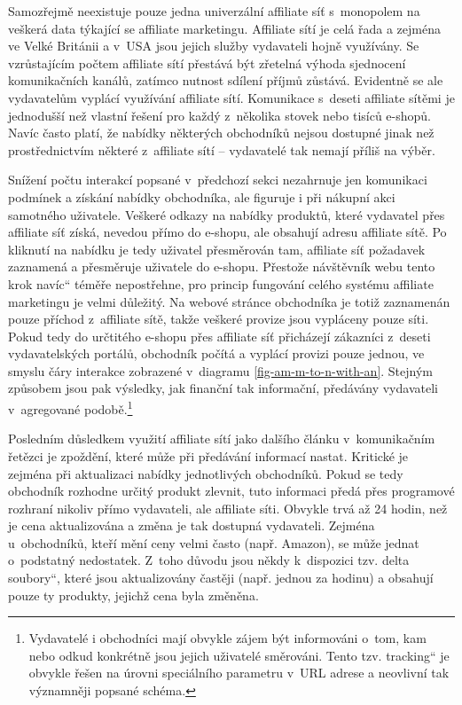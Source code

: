 \documentclass[12pt,oneside,openany]{fithesis}
\begin{document}
Samozřejmě neexistuje pouze jedna univerzální affiliate síť s~monopolem 
na veškerá data týkající se affiliate marketingu. Affiliate sítí je 
celá řada a zejména ve Velké Británii a v~USA jsou jejich služby 
vydavateli hojně využívány. Se vzrůstajícím počtem affiliate sítí 
přestává být zřetelná výhoda sjednocení komunikačních kanálů, 
zatímco nutnost sdílení příjmů zůstává. Evidentně se ale vydavatelům 
vyplácí využívání affiliate sítí. Komunikace s~deseti affiliate 
sítěmi je jednodušší než vlastní řešení pro každý z~několika 
stovek nebo tisíců e-shopů. Navíc často platí, že nabídky některých 
obchodníků nejsou dostupné jinak než prostřednictvím některé 
z~affiliate sítí -- vydavatelé tak nemají příliš na výběr.

Snížení počtu interakcí popsané v~předchozí sekci nezahrnuje jen 
komunikaci podmínek a získání nabídky obchodníka, ale figuruje i při 
nákupní akci samotného uživatele. Veškeré odkazy na nabídky produktů, 
které vydavatel přes affiliate síť získá, nevedou přímo do e-shopu, ale 
obsahují adresu affiliate sítě. Po kliknutí na nabídku je tedy uživatel 
přesměrován tam, affiliate síť požadavek zaznamená a přesměruje 
uživatele do e-shopu. Přestože návštěvník webu tento \glqq krok 
navíc\textquotedblleft{} téměře nepostřehne, pro princip fungování 
celého systému affiliate marketingu je velmi důležitý. Na webové stránce 
obchodníka je totiž zaznamenán pouze příchod z~affiliate sítě, takže 
veškeré provize jsou vypláceny pouze síti. Pokud tedy do určtitého 
e-shopu přes affiliate síť přicházejí zákazníci z~deseti 
vydavatelských portálů, obchodník počítá a vyplácí provizi pouze 
jednou, ve smyslu čáry interakce zobrazené v~diagramu 
\hyperlink{fig-am-m-to-n-with-an}{{\ref{fig-am-m-to-n-with-an}}}. Stejným 
způsobem jsou pak výsledky, jak finanční tak informační, předávány 
vydavateli v~agregované 
podobě.\footnote{
    Vydavatelé i obchodníci mají obvykle zájem být informováni o~tom, kam 
nebo odkud konkrétně jsou jejich uživatelé směrováni. Tento tzv. \glqq 
tracking\textquotedblleft{} je obvykle řešen na úrovni speciálního 
parametru v~URL adrese a neovlivní tak významněji popsané schéma.}

Posledním důsledkem využití affiliate sítí jako dalšího článku 
v~komunikačním řetězci je zpoždění, které může při předávání 
informací nastat. Kritické je zejména při aktualizaci nabídky 
jednotlivých obchodníků. Pokud se tedy obchodník rozhodne určitý produkt 
zlevnit, tuto informaci předá přes programové rozhraní nikoliv přímo 
vydavateli, ale affiliate síti. Obvykle trvá až 24 hodin, než je cena 
aktualizována a změna je tak dostupná vydavateli. Zejména u~obchodníků, 
kteří mění ceny velmi často (např. Amazon), se může jednat o~podstatný 
nedostatek. Z~toho důvodu jsou někdy k~dispozici tzv. \glqq delta 
soubory\textquotedblleft{}, které jsou aktualizovány častěji (např. jednou 
za hodinu) a obsahují pouze ty produkty, jejichž cena byla změněna.
\end{document}
